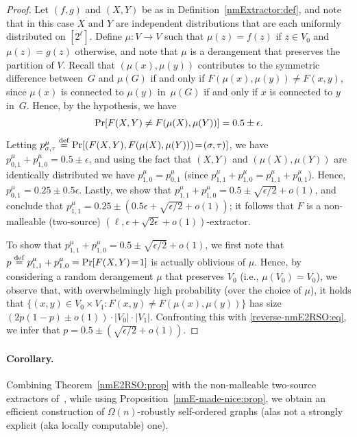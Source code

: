 \documentclass[10pt,a4paper]{article}
\theoremstyle{definition}
\newcommand{\prob}{{\rm Pr}}
\newcommand{\e}{\epsilon}
\newcommand{\eqdef}{\stackrel{\rm def}{=}}
\newcommand{\BPF}{\begin{proof}} \newcommand{\EPF}{\end{proof}}
\begin{document}
%
%
%
%
%
%
%
%
%
%
%
%
%
%
%
%
%
%
%

\BPF
Let $(f,g)$ and $(X,Y)$ be as in Definition~\ref{nmExtractor:def},
and note that in this case $X$ and $Y$ are independent distributions
that are each uniformly distributed on $[2^\ell]$.
%
%
%
Define $\mu:V\to V$ such that $\mu(z)=f(z)$ if $z\in V_0$
and $\mu(z)=g(z)$ otherwise, and note that $\mu$ is a derangement
that preserves the partition of $V$.
Recall that $(\mu(x),\mu(y))$ contributes to the symmetric difference
between~$G$ and $\mu(G)$ if and only if $F(\mu(x),\mu(y))\neq F(x,y)$,
since $\mu(x)$ is connected to $\mu(y)$ in~$\mu(G)$
if and only if $x$ is connected to $y$ in~$G$.
Hence, by the hypothesis, we have
\begin{equation}\label{reverse-nmE2RSO:eq}
\prob[F(X,Y)\neq F(\mu(X),\mu(Y))]=0.5\pm\e.
\end{equation}
Letting
$p_{\sigma,\tau}^\mu\eqdef\prob[(F(X,Y),F(\mu(X),\mu(Y)))\!=\!(\sigma,\tau)]$,
we have $p_{0,1}^\mu+p_{1,0}^\mu=0.5\pm\e$,
and using the fact that $(X,Y)$ and $(\mu(X),\mu(Y))$
are identically distributed we have $p_{1,0}^\mu=p_{0,1}^\mu$
(since $p_{1,1}^\mu+p_{1,0}^\mu=p_{1,1}^\mu+p_{0,1}^\mu$).
Hence, $p_{0,1}^\mu=0.25\pm0.5\e$.
Lastly, we show that $p_{1,1}^\mu+p_{1,0}^\mu=0.5\pm{\sqrt{\e/2}}+o(1)$,
and conclude that $p_{1,1}^\mu=0.25\pm(0.5\e+{\sqrt{\e/2}}+o(1))$;
it follows that $F$ is
a non-malleable (two-source) $(\ell,\e+{\sqrt{2\e}}+o(1))$-extractor.
%

To show that $p_{1,1}^\mu+p_{1,0}^\mu=0.5\pm{\sqrt{\e/2}}+o(1)$,
we first note that $p\eqdef p_{1,1}^\mu+p_{1,0}^\mu=\prob[F(X,Y)\!=\!1]$
is actually oblivious of $\mu$.
%
Hence, by considering a random derangement $\mu$ that preserves $V_0$
(i.e., $\mu(V_0)=V_0$), we observe that,
with overwhelmingly high probability (over the choice of $\mu$),
it holds that $\{(x,y)\!\in\!V_0\times V_1\!:\!F(x,y)\neq F(\mu(x),\mu(y))\}$
has size $(2p(1-p)\pm o(1))\cdot|V_0|\cdot|V_1|$.
%
%
%
%
%
Confronting this with \eqref{reverse-nmE2RSO:eq},
we infer that $p=0.5\pm({\sqrt{\e/2}}+o(1))$.
%
%
\EPF


\paragraph{Corollary.}
Combining Theorem~\ref{nmE2RSO:prop}
with the non-malleable two-source extractors of~\cite[Thm.~1]{CGL},
while using Proposition~\ref{nmE-made-nice:prop},
we obtain an efficient construction
of $\Omega(n)$-robustly self-ordered graphs
(alas not a strongly explicit (aka locally computable) one).
\end{document}

